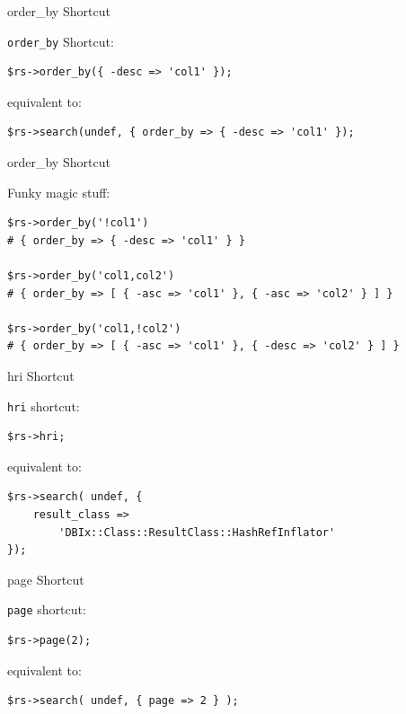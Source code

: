 \begin{frame}[fragile]{order\_by Shortcut}

\verb|order_by| Shortcut:

\begin{lstlisting}
$rs->order_by({ -desc => 'col1' });
\end{lstlisting}

equivalent to:

\begin{lstlisting}
$rs->search(undef, { order_by => { -desc => 'col1' });
\end{lstlisting}

\end{frame}

\begin{frame}[fragile]{order\_by Shortcut}

Funky magic stuff:
\begin{lstlisting}
$rs->order_by('!col1')
# { order_by => { -desc => 'col1' } }

$rs->order_by('col1,col2')
# { order_by => [ { -asc => 'col1' }, { -asc => 'col2' } ] }

$rs->order_by('col1,!col2')
# { order_by => [ { -asc => 'col1' }, { -desc => 'col2' } ] }
\end{lstlisting}
\end{frame}

\begin{frame}[fragile]{hri Shortcut}

\verb|hri| shortcut:

\begin{lstlisting}
$rs->hri;
\end{lstlisting}

equivalent to:

\begin{lstlisting}
$rs->search( undef, {
    result_class => 
        'DBIx::Class::ResultClass::HashRefInflator'
});
\end{lstlisting}
\end{frame}

\begin{frame}[fragile]{page Shortcut}

\verb|page| shortcut:

\begin{lstlisting}
$rs->page(2);
\end{lstlisting}

equivalent to:

\begin{lstlisting}
$rs->search( undef, { page => 2 } );
\end{lstlisting}

\end{frame}

